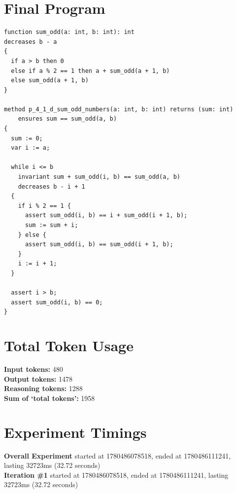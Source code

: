 \documentclass{article}
\begin{document}
\section*{Final Program}
\begin{lstlisting}
function sum_odd(a: int, b: int): int
decreases b - a
{
  if a > b then 0
  else if a % 2 == 1 then a + sum_odd(a + 1, b)
  else sum_odd(a + 1, b)
}

method p_4_1_d_sum_odd_numbers(a: int, b: int) returns (sum: int)
	ensures sum == sum_odd(a, b)
{
  sum := 0;
  var i := a;

  while i <= b
    invariant sum + sum_odd(i, b) == sum_odd(a, b)
    decreases b - i + 1
  {
    if i % 2 == 1 {
      assert sum_odd(i, b) == i + sum_odd(i + 1, b);
      sum := sum + i;
    } else {
      assert sum_odd(i, b) == sum_odd(i + 1, b);
    }
    i := i + 1;
  }

  assert i > b;
  assert sum_odd(i, b) == 0;
}
\end{lstlisting}
\section*{Total Token Usage}
\textbf{Input tokens: }480
\\\textbf{Output tokens: }1478
\\\textbf{Reasoning tokens: }1288
\\\textbf{Sum of `total tokens': }1958
\section*{Experiment Timings}
\textbf{Overall Experiment} started at 1780486078518, ended at 1780486111241, lasting 32723ms (32.72 seconds)
\\\textbf{Iteration \#1} started at 1780486078518, ended at 1780486111241, lasting 32723ms (32.72 seconds)
\end{document}
